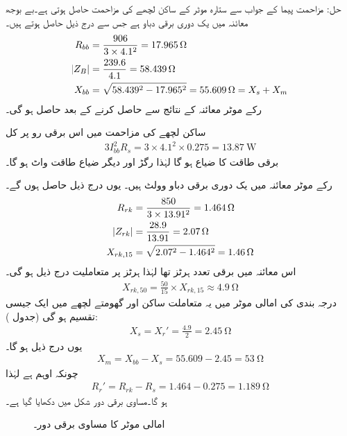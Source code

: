 حل:\quad
مزاحمت پیما کے جواب سے  ستارہ موٹر کے ساکن لچھے کی مزاحمت  حاصل ہوتی ہے۔بے بوجھ معائنہ میں یک دوری برقی دباو  ہے جس سے درج ذیل حاصل ہوتے ہیں۔
\begin{align*}
R_{bb} &=\frac{906}{3 \times 4.1^2}=\SI{17.965}{\ohm}\\
\abs{Z_B}&=\frac{239.6}{4.1}=\SI{58.439}{\ohm}\\
X_{bb}&=\sqrt{58.439^2-17.965^2}=\SI{55.609}{\ohm}=X_s+X_m
\end{align*}
رکے موٹر معائنہ کے نتائج سے  حاصل کرنے کے بعد  حاصل ہو گی۔

ساکن لچھے کی مزاحمت میں اس برقی رو پر کل
\begin{align*}
3 I_{bb}^2 R_s=3 \times 4.1^2 \times  0.275=\SI{13.87}{\watt}
\end{align*}
برقی طاقت کا ضیاع ہو گا لہٰذا رگڑ اور دیگر ضیاع طاقت  واٹ ہو گا۔

رکے موٹر معائنہ میں یک دوری برقی دباو  وولٹ ہیں۔ یوں درج ذیل حاصل ہوں گے۔
\begin{align*}
R_{rk}&=\frac{850}{3 \times 13.91^2}=\SI{1.464}{\ohm}\\
\abs{Z_{rk}}&=\frac{28.9}{13.91}=\SI{2.07}{\ohm}\\
X_{rk, 15}&=\sqrt{2.07^2-1.464^2}=\SI{1.46}{\ohm}
\end{align*}
اس معائنہ میں برقی تعدد  ہرٹز تھا لہٰذا  ہرٹز پر متعاملیت درج ذیل ہو گی۔
\begin{align*}
X_{rk,50}=\frac{50}{15} \times X_{rk,15} \approx \SI{4.9}{\ohm}
\end{align*}
درجہ بندی   کی امالی موٹر میں یہ متعاملت ساکن اور گھومتے لچھے میں ایک جیسی تقسیم ہو گی (جدول ):
\begin{align*}
X_s=X_r'=\frac{4.9}{2}=\SI{2.45}{\ohm}
\end{align*}
یوں درج ذیل ہو گا۔
\begin{align*}
X_m=X_{bb}-X_s=55.609-2.45=\SI{53}{\ohm}
\end{align*}
چونکہ   اوہم ہے  لہٰذا
\begin{align*}
R_r'=R_{rk}-R_s=1.464-0.275=\SI{1.189}{\ohm}
\end{align*}
ہو گا۔مساوی برقی دور شکل  میں دکھایا گیا ہے۔
\begin{figure}
\centering
\caption{امالی موٹر کا مساوی برقی دور۔}
\label{شکل_امالی_موٹر_مثال_کا_دور}
\end{figure}

